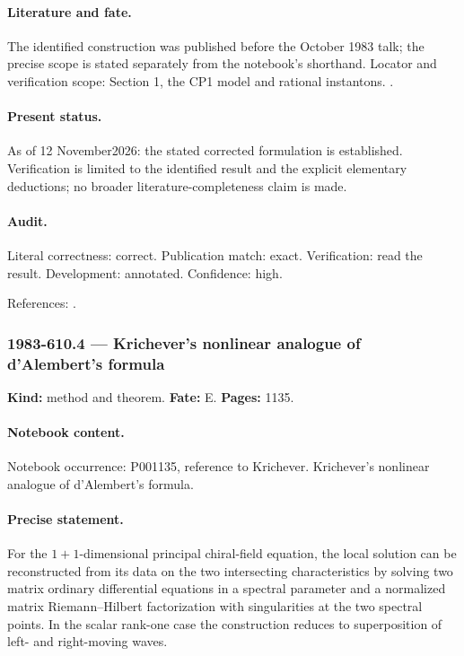 \paragraph{Literature and fate.} The identified construction was published before the October 1983 talk; the precise scope is stated separately from the notebook's shorthand. Locator and verification scope: Section 1, the CP1 model and rational instantons. \cite{perelomov1981instantons}.

\paragraph{Present status.} As of 12 November2026: the stated corrected formulation is established. Verification is limited to the identified result and the explicit elementary deductions; no broader literature-completeness claim is made.

\paragraph{Audit.} Literal correctness: correct. Publication match: exact. Verification: read the result. Development: annotated. Confidence: high.

\noindent References: \citep{perelomov1981instantons}.\par

\subsubsection{1983-610.4 --- Krichever's nonlinear analogue of d'Alembert's formula}

\label{item:1983-610.4}

\noindent\textbf{Kind:} method and theorem. \textbf{Fate:} E. \textbf{Pages:} 1135.\par

\paragraph{Notebook content.} Notebook occurrence: P001135, reference to Krichever. Krichever's nonlinear analogue of d'Alembert's formula.

\paragraph{Precise statement.} For the \(1+1\)-dimensional principal chiral-field equation, the local solution can be reconstructed from its data on the two intersecting characteristics by solving two matrix ordinary differential equations in a spectral parameter and a normalized matrix Riemann--Hilbert factorization with singularities at the two spectral points. In the scalar rank-one case the construction reduces to superposition of left- and right-moving waves.

